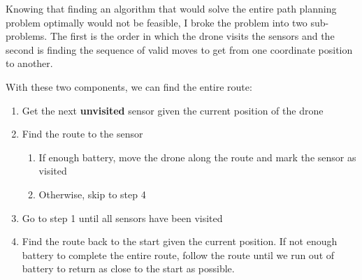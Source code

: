 \documentclass[11pt]{article}
\begin{document}
Knowing that finding an algorithm that would solve the entire path planning problem optimally would not be feasible, I broke the problem into two sub-problems. The first is the order in which the drone visits the sensors and the second is finding the sequence of valid moves to get from one coordinate position to another.

With these two components, we can find the entire route:
\begin{enumerate}[topsep=0pt, itemsep=0pt]
    \item Get the next \textbf{unvisited} sensor given the current position of the drone
    \item Find the route to the sensor
    \begin{enumerate}[topsep=0pt, itemsep=0pt]
        \item If enough battery, move the drone along the route and mark the sensor as visited
        \item Otherwise, skip to step 4
    \end{enumerate}
    \item Go to step 1 until all sensors have been visited
    \item Find the route back to the start given the current position. If not enough battery to complete the entire route, follow the route until we run out of battery to return as close to the start as possible.
\end{enumerate}
\end{document}
